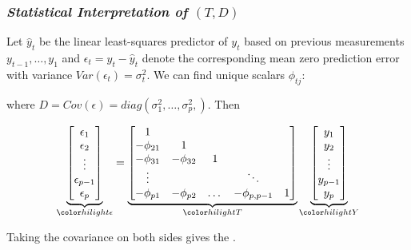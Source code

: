 \begin{frame}
\frametitle{\emph{Statistical Interpretation of $\left(T,D\right)$}}{}
\footnotesize
Let $\hat{y}_t$ be the linear least-squares predictor of $y_t$ based on previous measurements $y_{t-1}, \dots , y_1$ and $\epsilon_t = y_t - \hat{y}_t$ denote the corresponding mean zero prediction error with variance $Var\left(\epsilon_t\right) = \sigma_t^2$. We can find unique scalars $\phi_{tj}$:


where $D = Cov\left( \epsilon \right) = diag\left( \sigma_1^2,\dots,\sigma_p^2, \right)$. Then

\begin{align*}
\underbrace{\begin{bmatrix}
\epsilon_1 \\
\epsilon_2 \\ \vdots \\\epsilon_{p-1} \\ \epsilon_p
\end{bmatrix}}_{\nt{\epsilon}} = \underbrace{\begin{bmatrix}
1&&&&\\
-\phi_{21}&1&&&\\
-\phi_{31}&-\phi_{32}&1&&\\
\vdots &&&\ddots& \\
-\phi_{p1}&-\phi_{p2}& \dots & -\phi_{p,p-1}&1\\
\end{bmatrix}}_{\nt{T}}
\underbrace{\begin{bmatrix}
y_1 \\
y_2 \\ \vdots \\ y_{p-1}\\y_p
\end{bmatrix}}_{\nt{Y}}
\end{align*}

Taking the covariance on both sides gives the .
\end{frame}


